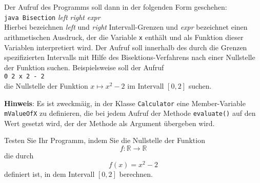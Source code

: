 \documentclass{article}
\begin{document}
Der Aufruf des Programms soll dann in der folgenden Form geschehen:
\\[0.2cm]
\hspace*{1.3cm}
\texttt{java Bisection} \textsl{left} \textsl{right} \textsl{expr}
\\[0.2cm]
Hierbei bezeichnen  \textsl{left} und \textsl{right} Intervall-Grenzen und \textsl{expr}
bezeichnet einen arithmetischen Ausdruck, der die Variable \texttt{x} enth\"alt und als
Funktion dieser Variablen interpretiert wird.  Der Aufruf soll innerhalb des
durch die Grenzen spezifizierten Intervalls mit Hilfe des Bisektions-Verfahrens
nach einer Nullstelle der Funktion suchen.  Beispielsweise soll der Aufruf
\\[0.2cm]
\hspace*{1.3cm}
\texttt{0 2 x  2 - 2}
\\[0.2cm]
die Nullstelle der Funktion $x \mapsto x^2 - 2$ im Intervall $[0, 2]$ suchen.
\vspace{0.3cm}

\noindent
\textbf{Hinweis}:  Es ist zweckm\"a\3ig, in der Klasse \texttt{Calculator} eine
Member-Variable \texttt{mValueOfX} zu definieren, die bei jedem Aufruf der Methode
\texttt{evaluate()} auf den Wert gesetzt wird, der der Methode als Argument \"ubergeben wird.
\vspace{0.3cm}

\noindent
Testen Sie Ihr Programm, indem Sie die Nullstelle der Funktion 
\[ f: \mathbb{R} \rightarrow \mathbb{R} \]
die durch 
\[ f(x) = x^2 - 2 \]
definiert ist, in dem Intervall $[0,2]$ berechnen.
\end{document}

